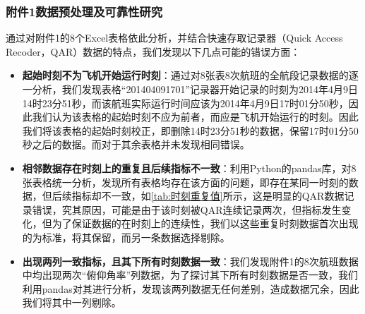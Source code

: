 \documentclass{MathorCupModeling}
\begin{document}
	\subsubsection{附件1数据预处理及可靠性研究}
	通过对附件1的8个Excel表格依此分析，并结合快速存取记录器（Quick Access Recoder，QAR）数据的特点，我们发现以下几点可能的错误方面：
	\begin{itemize}
		\item \textbf{起始时刻不为飞机开始运行时刻}：通过对8张表8次航班的全航段记录数据的逐一分析，我们发现表格“201404091701”记录器开始记录的时刻为2014年4月9日14时23分51秒，而该航班实际运行时间应该为2014年4月9日17时01分50秒，因此我们认为该表格的起始时刻不应为前者，而应是飞机开始运行的时刻。因此我们将该表格的起始时刻校正，即删除14时23分51秒的数据，保留17时01分50秒之后的数据。而对于其余表格并未发现相同错误。
		\item \textbf{相邻数据存在时刻上的重复且后续指标不一致}：利用Python的pandas库，对8张表格统一分析，发现所有表格均存在该方面的问题，即存在某同一时刻的数据，但后续指标却不一致，如\textcolor{blue}{\cref{tab:时刻重复值}}所示，这是明显的QAR数据记录错误，究其原因，可能是由于该时刻被QAR连续记录两次，但指标发生变化，但为了保证数据的在时刻上的连续性，我们以这些重复时刻数据首次出现的为标准，将其保留，而另一条数据选择剔除。
\begin{table}[htbp]
	\centering
	\caption{表格“201404101159”时刻重复值（部分列）}
	\label{tab:时刻重复值}
\end{table}

		\item \textbf{出现两列一致指标，且其下所有时刻数据一致}：我们发现附件1的8次航班数据中均出现两次“俯仰角率”列数据，为了探讨其下所有时刻数据是否一致，我们利用pandas对其进行分析，发现该两列数据无任何差别，造成数据冗余，因此我们将其中一列剔除。
	\end{itemize}
\end{document}
